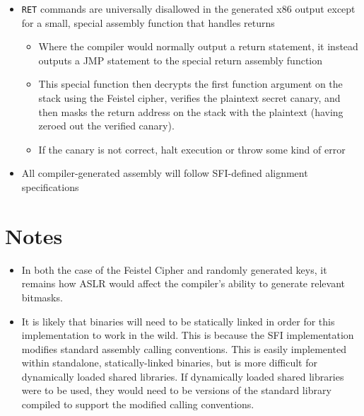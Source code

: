 \documentclass[12pt]{article}
\begin{document}
\begin{itemize}
\begin{itemize}
	\end{itemize}
	\item \texttt{RET} commands are universally disallowed in the generated x86 output except for a small, special assembly function that handles returns
	\begin{itemize}
		\item Where the compiler would normally output a return statement, it instead outputs a JMP statement to the special return assembly function
		\item This special function then decrypts the first function argument on the stack using the Feistel cipher, verifies the plaintext secret canary, and then masks the return address on the stack with the plaintext (having zeroed out the verified canary).
		\item If the canary is not correct, halt execution or throw some kind of error
	\end{itemize}
	\item All compiler-generated assembly will follow SFI-defined alignment specifications

\end{itemize}

\section{Notes}

\begin{itemize}	
	\item In both the case of the Feistel Cipher and randomly generated keys, it remains how ASLR would affect the compiler’s ability to generate relevant bitmasks.

	\item It is likely that binaries will need to be statically linked in order for this implementation to work in the wild. This is because the SFI implementation modifies standard assembly calling conventions. This is easily implemented within standalone, statically-linked binaries, but is more difficult for dynamically loaded shared libraries. If dynamically loaded shared libraries were to be used, they would need to be versions of the standard library compiled to support the modified calling conventions.
\end{itemize}

\medskip
 
\printbibliography
 
\end{document}
